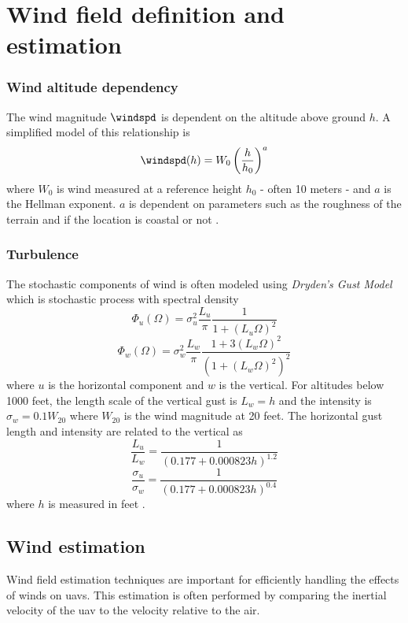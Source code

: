 \chapter{Wind field definition and estimation}\label{cha:wind}

\subsection{Wind altitude dependency}
The wind magnitude $\windspd$ is dependent on the altitude above ground $h$. A simplified model of this relationship is 
\begin{equation}
    \windspd(h)=W_{0}\left(\frac{h}{h_0}\right)^a
\end{equation}
where $W_{0}$ is wind measured at a reference height $h_0$ - often 10 meters - and $a$ is the Hellman exponent. $a$ is dependent on parameters such as the 
roughness of the terrain and if the location is coastal or not \cite{wind_hellman}.
\subsection{Turbulence}
The stochastic components of wind is often modeled using \textit{Dryden's Gust Model} which is stochastic process with spectral density 
\begin{equation}
    \Phi_u(\Omega)=\sigma_u^2\frac{L_u}{\pi}\frac{1}{1+(L_u\Omega)^2}
\end{equation}
\begin{equation}
    \Phi_w(\Omega)=\sigma_w^2\frac{L_w}{\pi}\frac{1 + 3(L_w\Omega)^2}{(1+(L_w\Omega)^2)^2}
\end{equation}
where $u$ is the horizontal component and $w$ is the vertical. For altitudes below 1000 feet, the length scale of the vertical gust is 
$L_w=h$ and the intensity is $\sigma_w=0.1W_{20}$ where $W_{20}$ is the wind magnitude at 20 feet. The horizontal gust length and intensity are related to the vertical as 
\begin{equation}
    \frac{L_u}{L_w}=\frac{1}{(0.177 + 0.000823h)^{1.2}}
\end{equation}
\begin{equation}
    \frac{\sigma_u}{\sigma_w}=\frac{1}{(0.177 + 0.000823h)^{0.4}}
\end{equation}
where $h$ is measured in feet \cite{wind_direct_computation}.

\section{Wind estimation}
Wind field estimation techniques are important for efficiently handling the effects of winds on \acp{uav}. 
This estimation is often performed by comparing the inertial velocity of the \ac{uav} to the velocity relative to the air.
